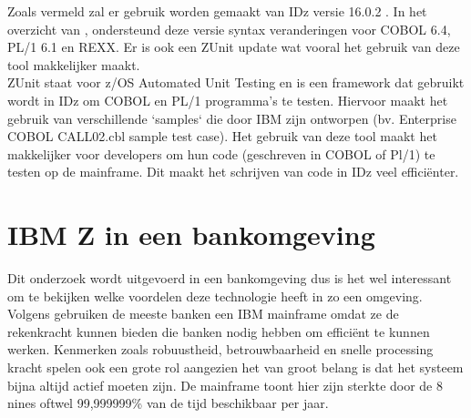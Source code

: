Zoals vermeld zal er gebruik worden gemaakt van IDz versie 16.0.2 . In het overzicht van \textcite{IBM2024}, ondersteund deze versie syntax veranderingen voor COBOL 6.4, PL/1 6.1 en REXX. Er is ook een ZUnit update wat vooral het gebruik van deze tool makkelijker maakt. \\

ZUnit staat voor z/OS Automated Unit Testing en is een framework dat gebruikt wordt in IDz om COBOL en PL/1 programma's te testen. Hiervoor maakt het gebruik van verschillende `samples` die door IBM zijn ontworpen (bv. Enterprise COBOL CALL02.cbl sample test case). Het gebruik van deze tool maakt het makkelijker voor developers om hun code (geschreven in COBOL of Pl/1) te testen op de mainframe. Dit maakt het schrijven van code in IDz veel efficiënter. \autocite{IBM2024a}


\section{IBM Z in een bankomgeving}
Dit onderzoek wordt uitgevoerd in een bankomgeving dus is het wel interessant om te bekijken welke voordelen deze technologie heeft in zo een omgeving. \\ 
Volgens \textcite{Turner2022} gebruiken de meeste banken een IBM mainframe omdat ze de rekenkracht kunnen bieden die banken nodig hebben om efficiënt te kunnen werken. Kenmerken zoals robuustheid, betrouwbaarheid en snelle processing kracht spelen ook een grote rol aangezien het van groot belang is dat het systeem bijna altijd actief moeten zijn. De mainframe toont hier zijn sterkte door de 8 nines oftwel 99,999999\% van de tijd beschikbaar per jaar. \autocite{IBMa}